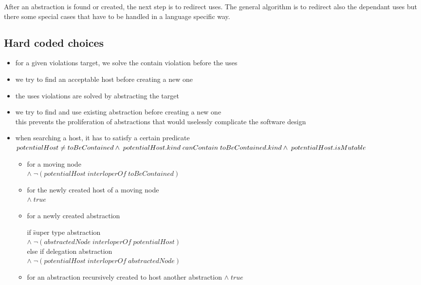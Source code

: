 \documentclass[]{article}
\begin{document}
After an abstraction is found or created, the next step is to redirect uses. The general algorithm is to redirect also the dependant uses but there some special cases that have to be handled in a language specific way.


\subsection{Hard coded choices}
\begin{itemize}
	\item for a given violations target, we solve the contain violation before the uses
	\item we try to find an acceptable host before creating a new one 
	\item the uses violations are solved by abstracting the target
	\item we try to find and use existing abstraction before creating a new one\\
		this prevents the proliferation of abstractions that would uselessly complicate the software design
	
	\item when searching a host, it has to satisfy a certain predicate\\
		$potentialHost\neq toBeContained\\
		 \wedge\; potentialHost.kind\; canContain\; toBeContained.kind\\
		 \wedge\; potentialHost.isMutable$
		\begin{itemize}
			\item for a moving node\\
			$\wedge\; \neg (potentialHost\; interloperOf\; toBeContained)$
			\item for the newly created host of a moving node\\
			$\wedge\; true$
			\item for a newly created abstraction
			\begin{tabbing}
			if \=super type abstraction\\
			\>$\wedge\; \neg(abstractedNode\; interloperOf\; potentialHost)$\\
			else if delegation abstraction\\
			\>$\wedge\; \neg(potentialHost\; interloperOf\; abstractedNode)$
			\end{tabbing}
			\item for an abstraction recursively created to host another abstraction
			$\wedge\; true$
		\end{itemize}
\end{itemize}
\end{document}
